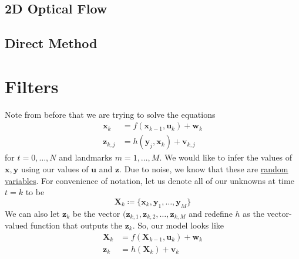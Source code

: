 \documentclass{article}
\begin{document}
  \subsection{2D Optical Flow}


  \subsection{Direct Method}

\section{Filters}

  Note from before that we are trying to solve the equations 
  \begin{align*}
      \mathbf{x}_{k} & = f(\mathbf{x}_{k-1}, \mathbf{u}_k) + \mathbf{w}_k \\
      \mathbf{z}_{k, j} & = h (\mathbf{y}_j , \mathbf{x}_k) + \mathbf{v}_{k, j}
  \end{align*}
  for $t = 0, \ldots, N$ and landmarks $m = 1, \ldots, M$. We would like to infer the values of $\mathbf{x}, \mathbf{y}$ using our values of $\mathbf{u}$ and $\mathbf{z}$. Due to noise, we know that these are \hyperref[prob-def:random-variable]{random variables}. For convenience of notation, let us denote all of our unknowns at time $t = k$ to be
  \begin{equation}
    \mathbf{X}_{k} \coloneqq \{\mathbf{x}_k, \mathbf{y}_1, \ldots, \mathbf{y}_M\}
  \end{equation}
  We can also let $\mathbf{z}_k$ be the vector $(\mathbf{z}_{k, 1}, \mathbf{z}_{k, 2}, \ldots, \mathbf{z}_{k, M}$ and redefine $h$ as the vector-valued function that outputs the $\mathbf{z}_k$. So, our model looks like 
  \begin{align*}
      \mathbf{X}_{k} & = f(\mathbf{X}_{k-1}, \mathbf{u}_k) + \mathbf{w}_k \\
      \mathbf{z}_{k} & = h (\mathbf{X}_k) + \mathbf{v}_{k}
  \end{align*}
\end{document}
